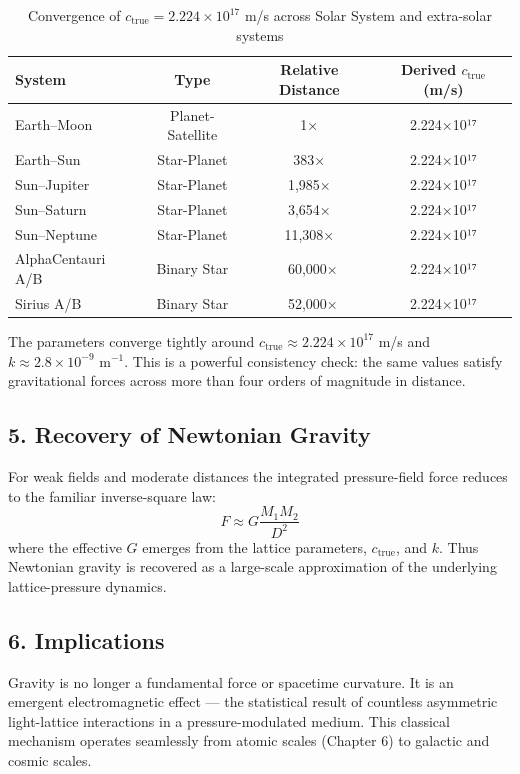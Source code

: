 \documentclass[11pt,a4paper]{book}
\begin{document}
\begin{table}[h]
\centering
\begin{tabular}{lccc}
\toprule
System & Type & Relative Distance & Derived \( c_{\text{true}} \) (m/s) \\
\midrule
Earth–Moon & Planet-Satellite & 1× & 2.224×10¹⁷ \\
Earth–Sun & Star-Planet & 383× & 2.224×10¹⁷ \\
Sun–Jupiter & Star-Planet & 1{,}985× & 2.224×10¹⁷ \\
Sun–Saturn & Star-Planet & 3{,}654× & 2.224×10¹⁷ \\
Sun–Neptune & Star-Planet & 11{,}308× & 2.224×10¹⁷ \\
AlphaCentauri A/B & Binary Star & ~60{,}000× & 2.224×10¹⁷ \\
Sirius A/B & Binary Star & ~52{,}000× & 2.224×10¹⁷ \\
\bottomrule
\end{tabular}
\caption{Convergence of \( c_{\text{true}} = 2.224 \times 10^{17} \) m/s across Solar System and extra-solar systems}
\end{table}

The parameters converge tightly around \( c_{\text{true}} \approx 2.224 \times 10^{17} \) m/s and \( k \approx 2.8 \times 10^{-9} \) m\(^{-1}\). This is a powerful consistency check: the same values satisfy gravitational forces across more than four orders of magnitude in distance.

\subsection{5. Recovery of Newtonian Gravity}
For weak fields and moderate distances the integrated pressure-field force reduces to the familiar inverse-square law:
\[
F \approx G \frac{M_1 M_2}{D^2}
\]
where the effective \( G \) emerges from the lattice parameters, \( c_{\text{true}} \), and \( k \). Thus Newtonian gravity is recovered as a large-scale approximation of the underlying lattice-pressure dynamics.

\subsection{6. Implications}
Gravity is no longer a fundamental force or spacetime curvature. It is an emergent electromagnetic effect — the statistical result of countless asymmetric light-lattice interactions in a pressure-modulated medium. This classical mechanism operates seamlessly from atomic scales (Chapter 6) to galactic and cosmic scales.
\end{document}
